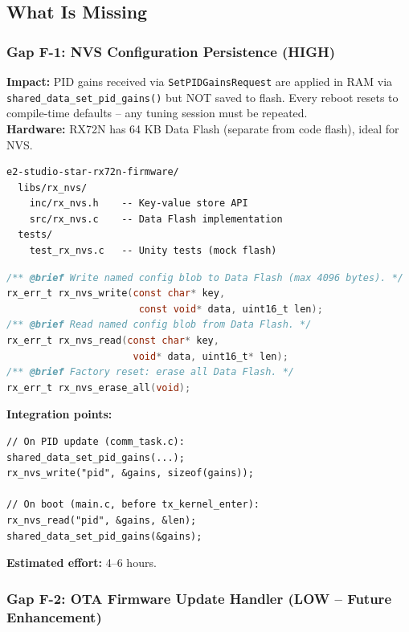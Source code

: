 \documentclass[12pt,a4paper]{article}
\begin{document}
\subsection{What Is Missing}

\subsubsection{Gap F-1: NVS Configuration Persistence (HIGH)}

\begin{warnbox}
  \textbf{Impact:} PID gains received via \texttt{SetPIDGainsRequest} are applied in RAM via
  \texttt{shared\_data\_set\_pid\_gains()} but NOT saved to flash. Every reboot resets to
  compile-time defaults -- any tuning session must be repeated.\\
  \textbf{Hardware:} RX72N has 64 KB Data Flash (separate from code flash), ideal for NVS.
\end{warnbox}

\begin{lstlisting}[caption={Files to create for NVS}]
e2-studio-star-rx72n-firmware/
  libs/rx_nvs/
    inc/rx_nvs.h    -- Key-value store API
    src/rx_nvs.c    -- Data Flash implementation
  tests/
    test_rx_nvs.c   -- Unity tests (mock flash)
\end{lstlisting}

\begin{lstlisting}[language=C, caption={NVS API (rx\_nvs.h)}]
/** @brief Write named config blob to Data Flash (max 4096 bytes). */
rx_err_t rx_nvs_write(const char* key,
                       const void* data, uint16_t len);
/** @brief Read named config blob from Data Flash. */
rx_err_t rx_nvs_read(const char* key,
                      void* data, uint16_t* len);
/** @brief Factory reset: erase all Data Flash. */
rx_err_t rx_nvs_erase_all(void);
\end{lstlisting}

\textbf{Integration points:}

\begin{lstlisting}
// On PID update (comm_task.c):
shared_data_set_pid_gains(...);
rx_nvs_write("pid", &gains, sizeof(gains));

// On boot (main.c, before tx_kernel_enter):
rx_nvs_read("pid", &gains, &len);
shared_data_set_pid_gains(&gains);
\end{lstlisting}

\textbf{Estimated effort:} 4--6 hours.

\subsubsection{Gap F-2: OTA Firmware Update Handler (LOW -- Future Enhancement)}
\end{document}
